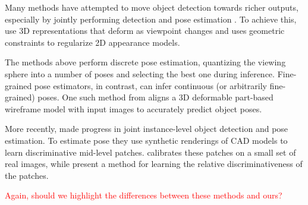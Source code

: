 \documentclass[10pt,twocolumn,letterpaper]{article}
\begin{document}
Many methods have attempted to move object detection towards richer outputs, especially by jointly performing detection and pose estimation \cite{Pepik12, Xiang12, Fidler12, Xiang14, Hejrati14, Aubry14, Lim14}. To achieve this, \cite{Xiang12, Hejrati14, Fidler12} use 3D representations that deform as viewpoint changes and \cite{Pepik12} uses geometric constraints to regularize 2D appearance models.

The methods above perform discrete pose estimation, quantizing the viewing sphere into a number of poses and selecting the best one during inference. Fine-grained pose estimators, in contrast, can infer continuous (or arbitrarily fine-grained) poses. One such method from \cite{Zia13} aligns a 3D deformable part-based wireframe model with input images to accurately predict object poses.

More recently, \cite{Aubry14, Lim14} made progress in joint instance-level object detection and pose estimation. To estimate pose they use synthetic renderings of CAD models to learn discriminative mid-level patches. \cite{Aubry14} calibrates these patches on a small set of real images, while \cite{Lim14} present a method for learning the relative discriminativeness of the patches.

\textcolor{red}{Again, should we highlight the differences between these methods and ours?}

  
\end{document}
